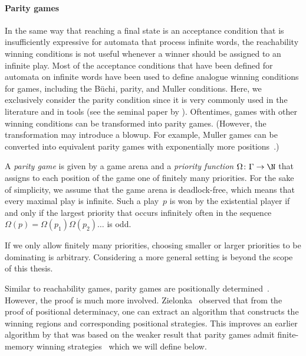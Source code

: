 \documentclass[../../diss.tex]{subfiles}
\begin{document}
\paragraph{Parity games}

In the same way that reaching a final state is an acceptance condition that is insufficiently expressive for automata that process infinite words, the reachability winning conditions is not useful whenever a winner should be assigned to an infinite play.
Most of the acceptance conditions that have been defined for automata on infinite words have been used to define analogue winning conditions for games, including the Büchi, parity, and Muller conditions.
Here, we exclusively consider the parity condition since it is very commonly used in the literature and in tools (see \eg the seminal paper by ).
Oftentimes, games with other winning conditions can be transformed into parity games.
(However, the transformation may introduce a blowup. For example, Muller games can be converted into equivalent parity games with exponentially more positions~\cite{DziembowskiJW97}.)

A \emph{parity game} is given by a game arena and a \emph{priority function} $\Omega \colon \configs \to \N$ that assigns to each position of the game one of finitely many priorities.
For the sake of simplicity, we assume that the game arena is deadlock-free, which means that every maximal play is infinite.
Such a play~$p$ is won by the existential player if and only if the largest priority that occurs infinitely often in the sequence $\Omega(p) = \Omega(p_1) \Omega(p_2) \ldots$ is odd.

If we only allow finitely many priorities, choosing smaller or larger priorities to be dominating is arbitrary.
Considering a more general setting is beyond the scope of this thesis.

Similar to reachability games, parity games are positionally determined~\cite{Mostowski91,EmersonJ91}.
However, the proof is much more involved.
Zielonka~\cite{Zielonka98} observed that from the proof of positional determinacy, one can extract an algorithm that constructs the winning regions and corresponding positional strategies.
This improves an earlier algorithm by  that was based on the weaker result that parity games admit finite-memory winning strategies~\cite{GurevichH82} which we will define below.
\end{document}
